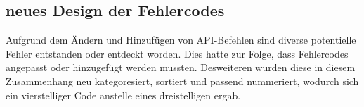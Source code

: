 \documentclass[parskip=full,11pt]{scrartcl}
\begin{document}
\subsection{neues Design der Fehlercodes}
	Aufgrund dem Ändern und Hinzufügen von API-Befehlen
	sind diverse potentielle Fehler entstanden oder entdeckt worden.
	Dies hatte zur Folge, dass Fehlercodes angepasst
	oder hinzugefügt werden mussten.
	Desweiteren wurden diese in diesem Zusammenhang neu kategoresiert,
	sortiert und passend nummeriert, wodurch sich ein vierstelliger Code
	anstelle eines dreistelligen ergab.
\end{document}
